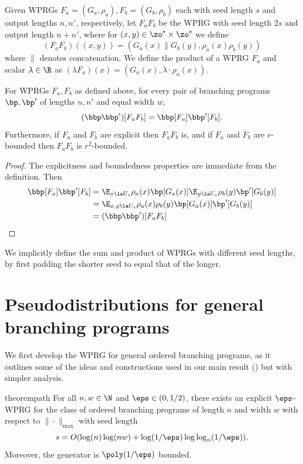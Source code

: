 \documentclass{toc}
\begin{document}
\begin{definition}\label{def:prodrule}
Given WPRGs $F_a=(G_a,\rho_a),F_b=(G_b,\rho_b)$ each with seed length $s$ and output lengths $n,n'$, respectively, %
let $F_aF_b$ be the WPRG with seed length $2s$ and output length $n+n'$, where for $(x,y)\in \zo^s\times\zo^s$ we define
\[(F_a F_b)((x,y)) = (G_a(x)\|G_b(y),\rho_a(x)\rho_b(y))\]
where $\|$ denotes concatenation. We define the product of a WPRG $F_a$ and scalar $\lambda \in \R$ as $(\lambda F_a)(x)=(G_a(x),\lambda\cdot\rho_a(x))$.
\end{definition}
\begin{lemma}
For WPRGs $F_a,F_b$ as defined above, for every pair of branching programs $\bp,\bp'$ of lengths $n,n'$ and equal width $w$,
$$(\bbp\bbp')[F_aF_b]=\bbp[F_a]\bbp'[F_b].$$
Furthermore, if $F_a$ and $F_b$ are explicit then $F_aF_b$ is, and if $F_a$ and $F_b$ are $r$-bounded then $F_aF_b$ is $r^2$-bounded.
\end{lemma}
\begin{proof}
The explicitness and boundedness properties are immediate from the definition. 
Then %
\begin{align*}
\bbp[F_a]\bbp'[F_b] &= \E_{x\la U_s}\rho_a(x)\bp[G_a(x)]\E_{y\la U_s}\rho_b(y)\bp'[G_b(y)]\\
&= \E_{x,y\la U_s}\rho_a(x)\rho_b(y)\bp[G_a(x)]\bp'[G_b(y)]\\
&= (\bbp\bbp')[F_aF_b] \qedhere
\end{align*}
\end{proof}
We implicitly define the sum and product of WPRGs with different seed lengths, by first padding the shorter seed to equal that of the longer.
    
\section{Pseudodistributions for general branching programs}\label{sec:path}
    We first develop the WPRG for general ordered branching programs, as it outlines some of the ideas and constructions used in our main result () but with simpler analysis.
    \begin{restatable}{theorem}{path}\label{thm:path}
        For all $n,w \in \N$ and $\eps \in (0,1/2)$, there exists an explicit $\eps$-WPRG for the class of ordered branching programs of length $n$ and width $w$ with respect to $\|\cdot\|_{\max}$ with seed length
        \[s=O(\log(n)\log(nw)+\log(1/\eps)\log\log_{n}(1/\eps)).\]
        Moreover, the generator is $\poly(1/\eps)$ bounded.
    \end{restatable}
\end{document}
